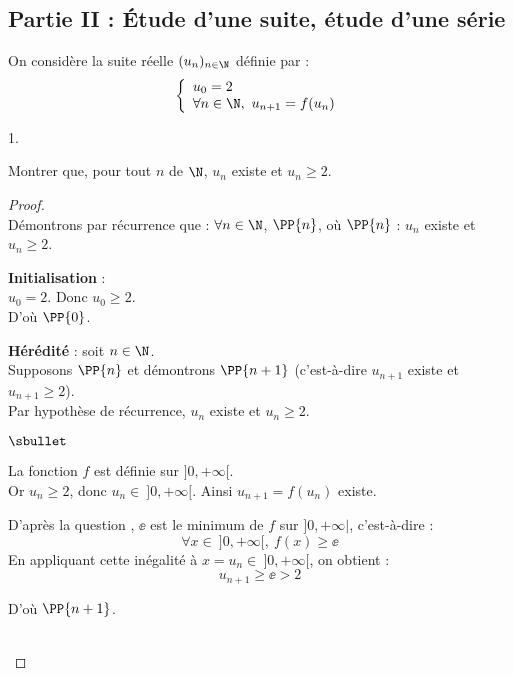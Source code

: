 \subsection*{Partie II : Étude d'une suite, étude d'une série}
\noindent
On considère la suite réelle $(u_n)_{n\in\N}$ définie par :
\[
\left\{
  \begin{array}{l}
    u_0=2\\
    \forall n \in\N, \ u_{n+1}=f(u_n)
  \end{array}
\right.
\]
\begin{noliste}{1.}
  \setlength{\itemsep}{2mm}
  \setcounter{enumi}{4}
\item Montrer que, pour tout $n$ de $\N$, $u_n$ existe et $u_n\geq 2$.
  
  \begin{proof}~\\
    Démontrons par récurrence que : $\forall n\in\N$, $\PP{n}$, \quad
    où \quad $\PP{n}$ : $u_n$ existe et $u_n\geq 2$.
    \begin{noliste}{\fitem}
    \item {\bf Initialisation} : \\
      $u_0=2$. Donc $u_0\geq 2$.\\
      D'où $\PP{0}$.
      
    \item {\bf Hérédité} : soit $n\in\N$.\\
      Supposons $\PP{n}$ et démontrons $\PP{n+1}$ (c'est-à-dire
      $u_{n+1}$ existe et $u_{n+1}\geq 2$).\\
      Par hypothèse de récurrence, $u_n$ existe et $u_n\geq 2$.
      \begin{noliste}{$\sbullet$}
      \item La fonction $f$ est définie sur $]0,+\infty[$.\\
        Or $u_n \geq 2$, donc $u_n \in \ ]0,+\infty[$. Ainsi $u_{n+1}
        = f(u_n)$ existe.
        
      \item D'après la question , $\ee$ est le minimum de $f$ 
        sur $]0,+\infty|$, c'est-à-dire : 
        \[
        \forall x \in \ ]0,+\infty[, \ f(x) \geq \ee
        \]
        En appliquant cette inégalité à $x = u_n\in \ ]0,+\infty[$, on
        obtient :
        \[
        u_{n+1} \geq \ee > 2
        \]
      \end{noliste}
      D'où $\PP{n+1}$.
    \end{noliste}
     ~\\[-1.2cm]
  \end{proof}
  

\end{noliste}

